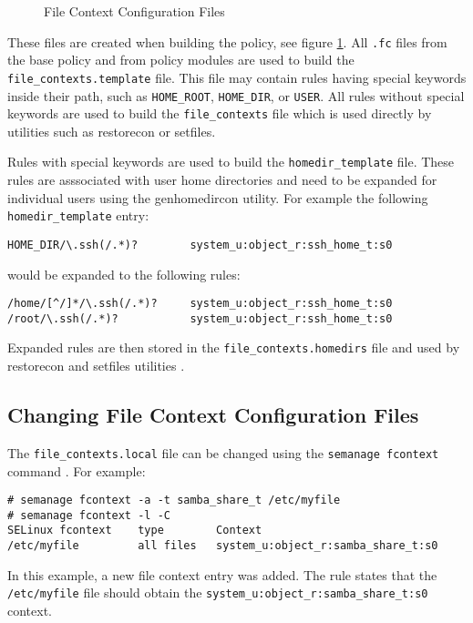 \begin{figure}
    \centering
    \label{fig:filecontexts}
    
    \caption{File Context Configuration Files}
\end{figure}

These files are created when building the policy, see figure
\ref{fig:filecontexts}. All \texttt{.fc} files from the base policy and from
policy modules are used to build the \texttt{file\_contexts.template} file. This
file may contain rules having special keywords inside their path, such as
\texttt{HOME\_ROOT}, \texttt{HOME\_DIR}, or \texttt{USER}. All rules without
special keywords are used to build the \texttt{file\_contexts} file which is
used directly by utilities such as restorecon or setfiles.

Rules with special keywords are used to build the \texttt{homedir\_template}
file. These rules are asssociated with user home directories and need to be
expanded for individual users using the genhomedircon utility. For example the
following \texttt{homedir\_template} entry:
\begin{lstlisting}
HOME_DIR/\.ssh(/.*)?        system_u:object_r:ssh_home_t:s0
\end{lstlisting}
would be expanded to the following rules:
\begin{lstlisting}
/home/[^/]*/\.ssh(/.*)?     system_u:object_r:ssh_home_t:s0
/root/\.ssh(/.*)?           system_u:object_r:ssh_home_t:s0
\end{lstlisting}
Expanded rules are then stored in the \texttt{file\_contexts.homedirs} file and
used by restorecon and setfiles utilities \cite[pp.~134--140]{tsn}.

\subsection{Changing File Context Configuration Files}
The \texttt{file\_contexts.local} file can be changed using the \texttt{semanage
fcontext} command \cite{selinuxguide}. For example:
\begin{lstlisting}
# semanage fcontext -a -t samba_share_t /etc/myfile
# semanage fcontext -l -C
SELinux fcontext    type        Context
/etc/myfile         all files   system_u:object_r:samba_share_t:s0
\end{lstlisting}
In this example, a new file context entry was added. The rule states that the
\texttt{/etc/myfile} file should obtain the
\texttt{system\_u:object\_r:samba\_share\_t:s0} context.

